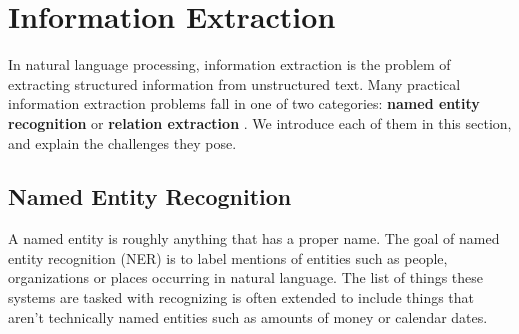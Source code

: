 \section{Information Extraction}
\label{information_extraction}
In natural language processing, information extraction is the problem of extracting structured information from unstructured text. Many practical information extraction problems fall in one of two categories: \textbf{named entity recognition} or \textbf{relation extraction} \citep{jurafsky09}. We introduce each of them in this section, and explain the challenges they pose.

\subsection{Named Entity Recognition}
\label{named_entity_recognition}
A named entity is roughly anything that has a proper name. The goal of named entity recognition (NER) is to label mentions of entities such as people, organizations or places occurring in natural language. The list of things these systems are tasked with recognizing is often extended to include things that aren't technically named entities such as amounts of money or calendar dates.

